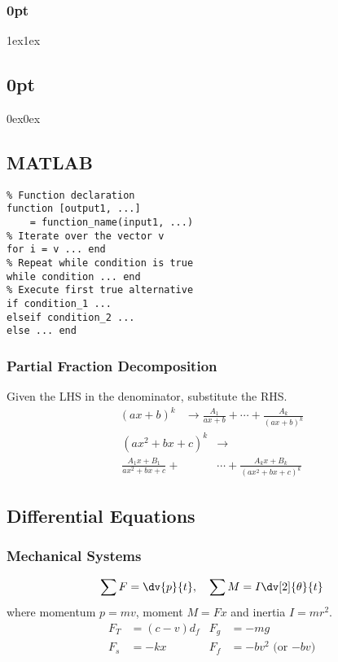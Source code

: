 \documentclass{article}
\begin{document}
\titlespacing*\subsubsection{0pt}{1ex}{1ex}
\titlespacing*\subsection{0pt}{0ex}{0ex}

\setlength{\abovecaptionskip}{-5pt}
\setlength{\textfloatsep}{0pt}

\setlength{\abovedisplayskip}{1pt}
\setlength{\belowdisplayskip}{1pt}

\begin{multicols}{3}
    \subsection*{MATLAB}
    \lstset{belowskip=0pt, aboveskip=0pt}
    \begin{lstlisting}
% Function declaration
function [output1, ...]
    = function_name(input1, ...)
% Iterate over the vector v
for i = v ... end 
% Repeat while condition is true
while condition ... end
% Execute first true alternative
if condition_1 ...
elseif condition_2 ... 
else ... end
\end{lstlisting}
    \subsubsection*{Partial Fraction Decomposition}
    Given the LHS in the denominator, substitute the RHS.
    \begin{align*}
        \left(ax+b\right)^k & \to \frac{A_1}{ax+b} + \cdots + \frac{A_k}{\left( ax+b \right)^k}
    \end{align*}
    \begin{align*}
        \left(ax^2+bx+c\right)^k     & \to                                                  \\
        \frac{A_1x+B_1}{ax^2+bx+c} + & \cdots + \frac{A_kx+B_k}{\left( ax^2+bx+c \right)^k}
    \end{align*}
    \subsection*{Differential Equations}
    \subsubsection*{Mechanical Systems}
    \begin{equation*}
        \sum F = \dv{p}{t},\quad \sum M = I \dv[2]{\theta}{t}
    \end{equation*}
    where momentum $p = mv$, moment $M=Fx$ and inertia $I=mr^2$.
    \begin{align*}
        F_T & = \left( c - v \right) d_f & F_g & = -mg                       \\
        F_s & = -kx                      & F_f & = -b v^2 \text{ (or $-bv$)}
    \end{align*}

\end{multicols}
\end{document}
